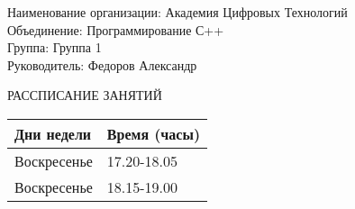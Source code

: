 \documentclass{article}
\begin{document}
\noindent
\vspace{2mm} %
 {Наименование организации: 
Академия Цифровых Технологий
 }
 \\
 \vspace{2mm} %
 {Объединение: 
Программирование С++
 }
 \\
 \vspace{2mm} %
 {Группа: 
Группа 1
 }
\\
 \vspace{2mm} %
 {Руководитель: 
Федоров Александр
 }
\\
\begin{center}
{ РАССПИСАНИЕ ЗАНЯТИЙ }
\\
 \vspace{8mm} %
 

\begin{tabular}{ |P{4cm}|P{7cm}|}
\hline
Дни недели&Время (часы)
\\ \hline
Воскресенье&17.20-18.05\\ \hline
Воскресенье&18.15-19.00\\ \hline

\end{tabular}


 \end{center}
 \restoregeometry
 

\clearpage
\end{document}

